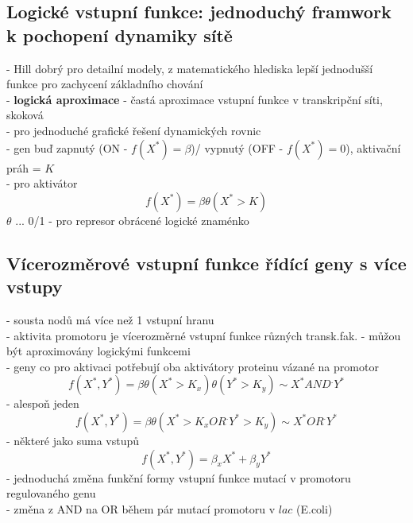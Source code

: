 \documentclass[11pt,a4paper]{report}
\begin{document}
\subsection{Logické vstupní funkce: jednoduchý framwork k pochopení dynamiky sítě}
- Hill dobrý pro detailní modely, z matematického hlediska lepší jednodušší funkce pro zachycení základního chování\\
- \textbf{logická aproximace} - častá aproximace vstupní funkce v transkripční síti, skoková\\
\indent - pro jednoduché grafické řešení dynamických rovnic \\
\indent - gen buď zapnutý (ON - $f(X^*)=\beta$)/ vypnutý (OFF - $f(X^*)=0$), aktivační práh = $K$\\
\indent - pro aktivátor\\
\begin{equation}
	f(X^*)=\beta\theta(X^*>K)
\end{equation}
\indent \indent $\theta$ ... 0/1
\indent - pro represor obrácené logické znaménko\\

\subsection{Vícerozměrové vstupní funkce řídící geny s více vstupy}
- sousta nodů má více než 1 vstupní hranu\\
- aktivita promotoru je vícerozměrné vstupní funkce různých transk.fak.
- můžou být aproximovány logickými funkcemi\\
- geny co pro aktivaci potřebují oba aktivátory proteinu vázané na promotor\\
\begin{equation}
	f(X^*,Y^*)=\beta\theta(X^*>K_x)\theta(Y^*>K_y)\sim X^*AND^{.}Y^*
\end{equation}
- alespoň jeden\\
\begin{equation}
f(X^*,Y^*)=\beta\theta(X^*>K_xOR^.Y^*>K_y)\sim X^*OR^{.}Y^*
\end{equation}
- některé jako suma vstupů\\
\begin{equation}
f(X^*,Y^*)=\beta_x X^*+\beta_y Y^*
\end{equation}
- jednoduchá změna funkční formy vstupní funkce mutací v promotoru regulovaného genu\\
\indent - změna z AND na OR během pár mutací promotoru v $lac$ (E.coli)\\
\end{document}
